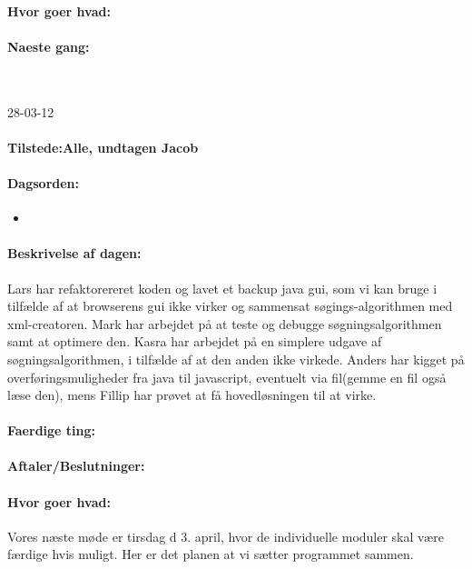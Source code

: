 \documentclass[a4paper,10pt,titlepage]{article}
\begin{document}
		\paragraph{Hvor goer hvad:}
		
		\paragraph{Naeste gang:}\mbox{}\\
		
		\begin{center}
		28-03-12
		\end{center}
		
		\paragraph{Tilstede:Alle, undtagen Jacob}
		\paragraph{Dagsorden:}
		\begin{itemize}
					\item 
					
		\end{itemize}
		
		\paragraph{Beskrivelse af dagen:}
		Lars har refaktorereret koden og lavet et backup java gui, som vi kan bruge i tilfælde af at browserens gui ikke virker og sammensat søgings-algorithmen med xml-creatoren.
Mark har arbejdet på at teste og debugge søgningsalgorithmen samt at optimere den. Kasra har arbejdet på en simplere udgave af søgningsalgorithmen, i tilfælde af at den anden ikke virkede.
Anders har kigget på overføringsmuligheder fra java til javascript, eventuelt via fil(gemme en fil også læse den), mens Fillip har prøvet at få hovedløsningen til at virke.

		\paragraph{Faerdige ting:}
		
		\paragraph{Aftaler/Beslutninger:}
		
		\paragraph{Hvor goer hvad:}
		Vores næste møde er tirsdag d 3. april, hvor de individuelle moduler skal være færdige hvis muligt. Her er det planen at vi sætter programmet sammen.
\end{document}
